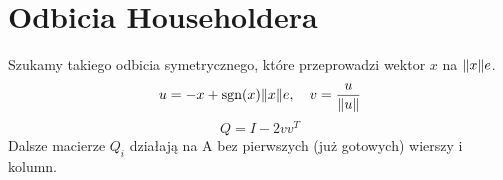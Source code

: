 \section{Odbicia Householdera}
Szukamy takiego odbicia symetrycznego, które przeprowadzi wektor \( x \) na \( \left\Vert x \right\Vert\!e \).
\[
    u = -x + \text{sgn}(x)\!\left\Vert x \right\Vert\!e,\quad v = \frac{u}{\left\Vert u \right\Vert}
\]
\[
    Q = I - 2vv^T
\]
Dalsze macierze \( Q_i \) działają na A bez pierwszych (już gotowych) wierszy i kolumn.